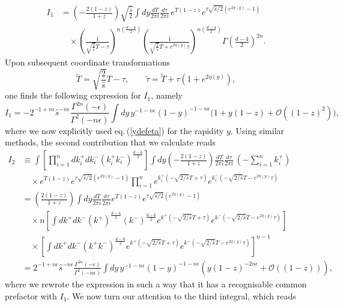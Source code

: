 \documentclass[11pt]{article}
\newcommand{\nn}{\nonumber}
\newcommand{\eps}{\epsilon}
\newcommand{\s}{\hat{s}}
\newcommand\eqn[1]     {eq.\,(\ref{#1})}
\begin{document}
\begin{align}
    I_1 &= \left(-\frac{2(1-z)}{1+z}\right)\sqrt{\frac{\s}{2}}\int dy \frac{dT}{2\pi i} \frac{d\tau}{2\pi i}\, e^{T(1-z)}e^{\tau\sqrt{\s/2}(e^{2\eta(y)}-1)} \nn\\
    &\quad\times \left(\frac{1}{\sqrt{\frac{2}{\s
    }}T-\tau}\right)^{n\left(\frac{d-4}{2}\right)}\left(\frac{1}{\sqrt{\frac{2}{\s
    }}T+e^{2\eta(y)}\tau}\right)^{n\left(\frac{d-4}{2}\right)}\Gamma\left(\frac{d-4}{2}\right)^{2n}.
\end{align}
Upon subsequent coordinate transformations $$\tilde{T}=\sqrt{\frac{2}{\s}}T-\tau,\qquad \tilde{\tau} = \tilde{T}+\tau(1+e^{2\eta(y)}),$$ one finds the following expression for $I_1$, namely
\begin{equation}
    I_1 = -2^{-1+n\eps}\s^{-n\eps}\frac{\Gamma^{2n}(-\eps)}{\Gamma^2(-n\eps)}\int dy\, y^{-1-n\eps}(1-y)^{-1-n\eps}\bigg(1+y(1-z)+\mathcal{O}((1-z)^2)\bigg),
\end{equation}
where we now explicitly used \eqn{ydefeta} for the rapidity $y$.
Using similar methods, the second contribution that we calculate reads 
\begin{align}
    I_2 &\equiv  \int\left[\prod_{i=1}^n dk_i^+dk_i^-(k_i^+k_i^-)^{\frac{d-6}{2}}\right] \int dy \left(-\frac{2(1-z)}{1+z}\right)\frac{dT}{2\pi i} \frac{d\tau}{2\pi i}\, \left(-\sum_{i=1}^nk_i^+\right)\nonumber \\
    &\quad\times e^{T(1-z)}e^{\tau\sqrt{\s/2}(e^{2\eta(y)}-1)} \prod_{i=1}^n e^{k_i^+(-\sqrt{2/\s}T+\tau)}e^{k_i^-(-\sqrt{2/\s}T-e^{2\eta(y)}\tau)} \nonumber \\
    &= \left(\frac{2(1-z)}{1+z}\right)\int dy\frac{dT}{2\pi i}\frac{d\tau}{2\pi i}e^{T(1-z)}e^{\tau\sqrt{\s/2}(e^{2\eta(y)}-1)}\nonumber \\
    &\quad\times n\left[\int dk^+dk^-(k^+)^{\frac{d-4}{2}}(k^-)^{\frac{d-6}{2}}e^{k^+(-\sqrt{2/\s}T+\tau)}e^{k^-(-\sqrt{2/\s}T-e^{2\eta(y)}\tau)}\right]\nonumber \\
    &\quad\times \left[\int dk^+dk^-(k^+k^-)^{\frac{d-6}{2}}e^{k^+(-\sqrt{2/\s}T+\tau)}e^{k^-(-\sqrt{2/\s}T-e^{2\eta(y)}\tau)}\right]^{n-1}\nonumber \\
    &=2^{-1+n\eps}\s^{-n\eps}\frac{\Gamma^{2n}\left(-\epsilon\right)}{\Gamma^2\left(-n\epsilon\right)}\int dy\,y^{-1-n\eps}(1-y)^{-1-n\eps}\left(y(1-z)^{-2n\epsilon}+\mathcal{O}((1-z))\right),
\end{align}
where we rewrote the expression in such a way that it has a recognisable common prefactor with $I_1$. We now turn our attention to the third integral, which reads
\end{document}
